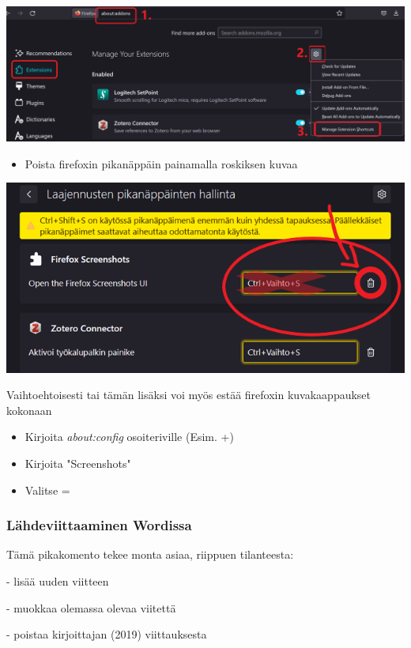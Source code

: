 \documentclass[a4paper,12pt]{scrartcl}
\begin{document}
\includegraphics[width=\textwidth]{img/firefox1}
\begin{itemize}
	\item Poista firefoxin pikanäppäin painamalla roskiksen kuvaa
\end{itemize}
\includegraphics[width=\textwidth]{img/firefox2}

Vaihtoehtoisesti tai tämän lisäksi voi myös estää firefoxin kuvakaappaukset kokonaan

\begin{itemize}
	\item Kirjoita \emph{about:config} osoiteriville (Esim. +)
	\item Kirjoita "Screenshots"
	\item Valitse  = 
\end{itemize}

\subsubsection{Lähdeviittaaminen Wordissa}

Tämä pikakomento tekee monta asiaa, riippuen tilanteesta:

- lisää uuden viitteen

- muokkaa olemassa olevaa viitettä

- poistaa kirjoittajan (2019) viittauksesta
\end{document}
